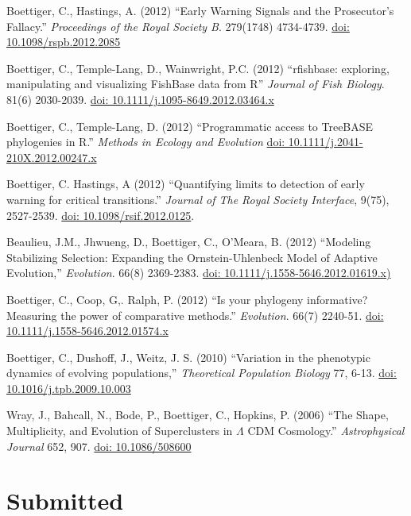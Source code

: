 \documentclass[margin]{res}
\begin{document}
\begin{resume}
Boettiger, C., Hastings, A. (2012) ``Early Warning Signals and the Prosecutor's Fallacy.'' {\it Proceedings of the Royal Society B}. 279(1748) 4734-4739.   \href{http://dx.doi.org/10.1098/rspb.2012.2085}{doi: 10.1098/rspb.2012.2085}

Boettiger, C., Temple-Lang, D., Wainwright, P.C. (2012) ``rfishbase: exploring, manipulating and visualizing FishBase data from R'' {\it Journal of Fish Biology}. 81(6) 2030-2039. \href{http://dx.doi.org/10.1111/j.1095-8649.2012.03464.x}{doi: 10.1111/j.1095-8649.2012.03464.x}

Boettiger, C., Temple-Lang, D. (2012)  ``Programmatic access to TreeBASE phylogenies in R.'' {\it Methods in Ecology and Evolution}  \href{http://dx.doi.org/10.1111/j.2041-210X.2012.00247.x}{doi: 10.1111/j.2041-210X.2012.00247.x}


Boettiger, C. Hastings, A (2012) ``Quantifying limits to detection of early warning for critical transitions.'' {\it Journal of The Royal Society Interface},  9(75), 2527-2539. \href{http://dx.doi.org/10.1098/rsif.2012.0125}{doi: 10.1098/rsif.2012.0125}.

Beaulieu, J.M., Jhwueng, D., Boettiger, C., O'Meara, B. (2012) ``Modeling Stabilizing Selection: Expanding the Ornstein-Uhlenbeck Model of Adaptive Evolution,'' {\it Evolution}. 66(8) 2369-2383. \href{http://dx.doi.org/10.1111/j.1558-5646.2012.01619.x}{doi: 10.1111/j.1558-5646.2012.01619.x)}

Boettiger, C., Coop, G,. Ralph, P. (2012) ``Is your phylogeny informative? Measuring the power of comparative methods.'' {\it Evolution}. 66(7) 2240-51. \href{http://dx.doi.org/10.1111/j.1558-5646.2012.01574.x}{doi: 10.1111/j.1558-5646.2012.01574.x}

Boettiger, C., Dushoff, J., Weitz, J. S. (2010) ``Variation in the phenotypic dynamics of evolving populations,'' {\it Theoretical Population Biology} 77, 6-13. \href{http://dx.doi.org/10.1016/j.tpb.2009.10.003}{doi: 10.1016/j.tpb.2009.10.003}

Wray, J., Bahcall, N., Bode, P., Boettiger, C., Hopkins, P.  (2006)  ``The Shape, Multiplicity, and Evolution of Superclusters in $\Lambda$ CDM Cosmology.''  {\it Astrophysical Journal} 652, 907. \href{http://dx.doi.org/10.1086/508600}{doi: 10.1086/508600}

\section{\textnormal{Submitted}}


\end{resume}
\end{document}
